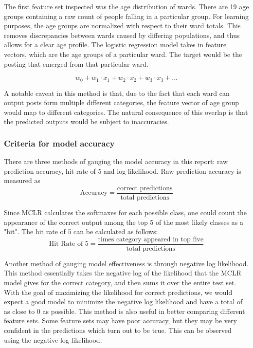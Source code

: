 \documentclass[12pt]{article}
\begin{document}
The first feature set inspected was the age distribution of wards. There are 19 age groups containing a raw count of people falling in a particular group. For learning purposes, the age groups are normalized with respect to their ward totals. This removes discrepancies between wards caused by differing populations, and thus allows for a clear age profile. The logistic regression model takes in feature vectors, which are the age groups of a particular ward. The target would be the posting that emerged from that particular ward.

\[w_0 + w_1 \cdot x_1 + w_2 \cdot x_2 + w_3 \cdot x_3 + ...\]

A notable caveat in this method is that, due to the fact that each ward can output posts form multiple different categories, the feature vector of age group would map to different categories. The natural consequence of this overlap is that the predicted outputs would be subject to inaccuracies. 

\subsubsection{Criteria for model accuracy}
There are three methods of gauging the model accuracy in this report: raw prediction accuracy, hit rate of 5 and log likelihood. Raw prediction accuracy is measured as 
\[\text{Accuracy} = \frac{\text{correct predictions}}{\text{total predictions}}\]

Since MCLR calculates the softmaxes for each possible class, one could count the appearance of the correct output among the top 5 of the most likely classes as a "hit". The hit rate of 5 can be calculated as follows:
\[\text{Hit Rate of 5} = \frac{\text{times category appeared in top five}}{\text{total predictions}}\]

Another method of gauging model effectiveness is through negative log likelihood. This method essentially takes the negative log of the likelihood that the MCLR model gives for the correct category, and then sums it over the entire test set. With the goal of maximizing the likelihood for correct predictions, we would expect a good model to minimize the negative log likelihood and have a total of as close to 0 as possible. This method is also useful in better comparing different feature sets. Some feature sets may have poor accuracy, but they may be very confident in the predictions which turn out to be true. This can be observed using the negative log likelihood.  
\end{document}
